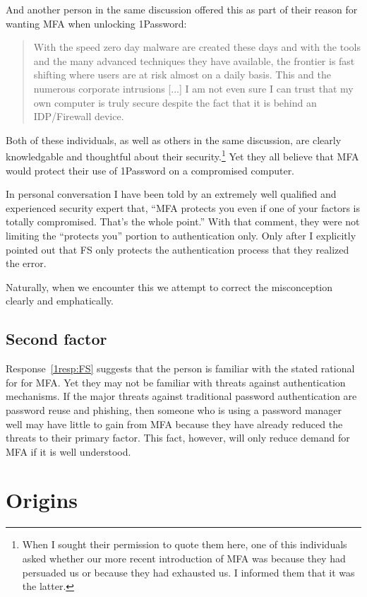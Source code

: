 \documentclass{soups}
\newcommand{\prop}[1]{\textsf{#1}}
\begin{document}
And another person in the same discussion offered this as part of their reason
for wanting MFA when unlocking 1Password:

\begin{quotation}
  With the speed zero day malware are created these days and with the tools and the many advanced techniques they have available, the frontier is fast shifting where users are at risk almost on a daily basis. This and the numerous corporate intrusions [...] I am not even sure I can trust that my own computer is truly secure despite the fact that it is behind an IDP/Firewall device.
\end{quotation}

Both of these individuals, as well as others in the same discussion,
are clearly knowledgable and thoughtful about their security.\footnote{When I sought their permission to quote them here, one of this individuals asked whether our more recent introduction of MFA was because they had persuaded us or because they had exhausted us. I informed them that it was the latter.} 
Yet they all believe that MFA would protect their use of 1Password on a compromised computer.

In personal conversation I have been told by an extremely well qualified and experienced security expert that,
 “MFA protects you even if one of your factors is totally compromised. That's the whole point.”
With that comment, they were not limiting the “protects you” portion to authentication only.
Only after I explicitly pointed out that  \prop{FS} only protects the authentication process that they realized the error.

Naturally, when we encounter this we attempt to correct the misconception 
clearly and emphatically.

\subsection{Second factor}

Response~\ref{1resp:FS} suggests that the person is familiar with the stated rational for for MFA.\@
Yet they may not be familiar with threats against authentication mechanisms.
If the major threats against traditional password authentication are password reuse and phishing,
then someone who is using a password manager well may have little to gain from
MFA because they have already reduced the threats to their primary factor.
This fact, however, will only reduce demand for MFA if it is well understood.

\section{Origins}
\end{document}
